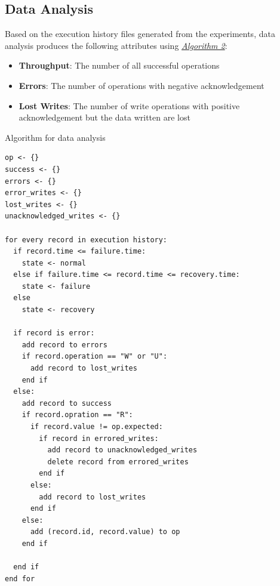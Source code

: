 \documentclass[12pt]{article}
\begin{document}
\subsection{Data Analysis}
Based on the execution history files generated from the experiments, data analysis produces the following attributes using \hyperref[alg:data]{\textit{Algorithm 2}}:\\
\begin{itemize}
  \item \textbf{Throughput}: The number of all successful operations
  \item \textbf{Errors}: The number of operations with negative acknowledgement
  \item \textbf{Lost Writes}: The number of write operations with positive acknowledgement but the data written are lost
\end{itemize}
\begin{algorithm}
\caption{Algorithm for data analysis}
\begin{verbatim}
op <- {}
success <- {}
errors <- {}
error_writes <- {}
lost_writes <- {}
unacknowledged_writes <- {}

for every record in execution history:
  if record.time <= failure.time:
    state <- normal
  else if failure.time <= record.time <= recovery.time:
    state <- failure
  else
    state <- recovery

  if record is error:
    add record to errors
    if record.operation == "W" or "U":
      add record to lost_writes
    end if
  else:
    add record to success
    if record.opration == "R":
      if record.value != op.expected:
        if record in errored_writes:
          add record to unacknowledged_writes
          delete record from errored_writes
        end if
      else:
        add record to lost_writes
      end if
    else:
      add (record.id, record.value) to op
    end if

  end if
end for
\end{verbatim}
\label{alg:data}
\end{algorithm}
\end{document}
